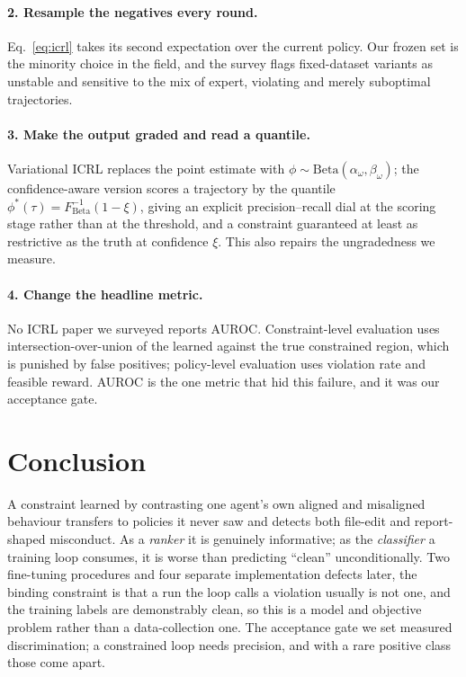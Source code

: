 \documentclass[11pt]{article}
\begin{document}
\paragraph{2. Resample the negatives every round.} Eq.~\eqref{eq:icrl} takes its
second expectation over the current policy. Our frozen set is the minority choice
in the field, and the survey flags fixed-dataset variants as unstable and
sensitive to the mix of expert, violating and merely suboptimal trajectories.

\paragraph{3. Make the output graded and read a quantile.} Variational ICRL
\cite{liu2023} replaces the point estimate with $\phi \sim
\mathrm{Beta}(\alpha_\omega, \beta_\omega)$; the confidence-aware version
\cite{subramanian2024} scores a trajectory by the quantile
$\phi^*(\tau) = F^{-1}_{\mathrm{Beta}}(1-\xi)$, giving an explicit
precision--recall dial at the scoring stage rather than at the threshold, and a
constraint guaranteed at least as restrictive as the truth at confidence $\xi$.
This also repairs the ungradedness we measure.

\paragraph{4. Change the headline metric.} No ICRL paper we surveyed reports
AUROC. Constraint-level evaluation uses intersection-over-union of the learned
against the true constrained region, which is punished by false positives;
policy-level evaluation uses violation rate and feasible reward. AUROC is the one
metric that hid this failure, and it was our acceptance gate.

\section{Conclusion}

A constraint learned by contrasting one agent's own aligned and misaligned
behaviour transfers to policies it never saw and detects both file-edit and
report-shaped misconduct. As a \emph{ranker} it is genuinely informative; as the
\emph{classifier} a training loop consumes, it is worse than predicting ``clean''
unconditionally. Two fine-tuning procedures and four separate implementation
defects later, the binding constraint is that a run the loop calls a violation
usually is not one, and the training labels are demonstrably clean, so this is a
model and objective problem rather than a data-collection one. The acceptance
gate we set measured discrimination; a constrained loop needs precision, and with
a rare positive class those come apart.
\end{document}
